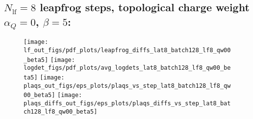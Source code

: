 %



\clearpage
\subsection{\texorpdfstring{$N_{\mathrm{lf}} = 8$}{Nlf = 8} leapfrog steps, topological charge weight
\texorpdfstring{$\alpha_Q = 0$}{alphaq = 0}, \texorpdfstring{$\beta = 5$}{beta = 5}:}
%
\begin{figure}[htpb]
  \centering
  \texttt{[image: lf\_out\_figs/pdf\_plots/leapfrog\_diffs\_lat8\_batch128\_lf8\_qw00\_beta5]}
  \hfill
  \texttt{[image: logdet\_figs/pdf\_plots/avg\_logdets\_lat8\_batch128\_lf8\_qw00\_beta5]}
  \hfill
  \texttt{[image: plaqs\_out\_figs/eps\_plots/plaqs\_vs\_step\_lat8\_batch128\_lf8\_qw00\_beta5]}
  \hfill
  \texttt{[image: plaqs\_diffs\_out\_figs/eps\_plots/plaqs\_diffs\_vs\_step\_lat8\_batch128\_lf8\_qw00\_beta5]}
\end{figure}

